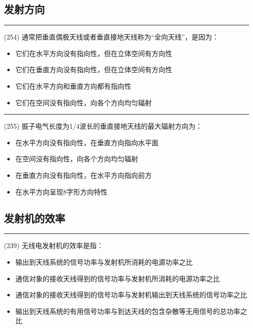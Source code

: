 \documentclass[twocolumn,hyperref,UTF8]{ctexart}  %
\begin{document}
\clearpage
\subsection{发射方向}


\noindent\rule{0.5\textwidth}{1pt}
\heiti (254) 通常把垂直偶极天线或者垂直接地天线称为“全向天线”，是因为： \songti {\color{gray} [LK0918] }
\begin{itemize}
	\item  它们在水平方向没有指向性，但在立体空间有方向性
	\item  它们在垂直方向没有指向性，但在立体空间有方向性
	\item  它们在水平方向和垂直方向都有指向性
	\item  它们在空间没有指向性，向各个方向均匀辐射
\end{itemize}


\noindent\rule{0.5\textwidth}{1pt}
\heiti (255) 振子电气长度为1/4波长的垂直接地天线的最大辐射方向为： \songti {\color{gray} [LK0919] }
\begin{itemize}
	\item  在水平方向没有指向性，在垂直方向指向水平面
	\item  在空间没有指向性，向各个方向均匀辐射
	\item  在垂直方向没有指向性，在水平方向指向前方
	\item  在水平方向呈现8字形方向特性
\end{itemize}


\clearpage
\subsection{发射机的效率}


\noindent\rule{0.5\textwidth}{1pt}
\heiti (239) 无线电发射机的效率是指： \songti {\color{gray} [LK0813] }
\begin{itemize}
	\item  输出到天线系统的信号功率与发射机所消耗的电源功率之比
	\item  通信对象的接收天线得到的信号功率与发射机所消耗的电源功率之比
	\item  通信对象的接收天线得到的信号功率与发射机输出到天线系统的信号功率之比
	\item  输出到天线系统的有用信号功率与到达天线的包含杂散等无用信号的总功率之比
\end{itemize}
\end{document}
